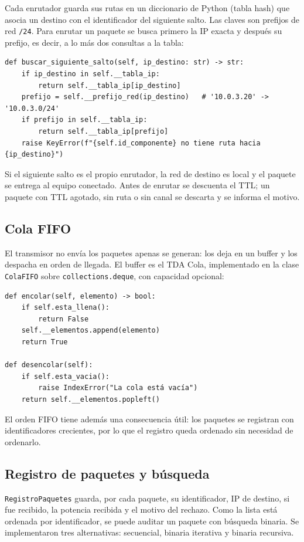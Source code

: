 \documentclass[11pt,a4paper]{article}
\begin{document}
Cada enrutador guarda sus rutas en un diccionario de Python (tabla hash) que
asocia un destino con el identificador del siguiente salto. Las claves son
prefijos de red \texttt{/24}. Para enrutar un paquete se busca primero la IP
exacta y después su prefijo, es decir, a lo más dos consultas a la tabla:

\begin{lstlisting}
def buscar_siguiente_salto(self, ip_destino: str) -> str:
    if ip_destino in self.__tabla_ip:
        return self.__tabla_ip[ip_destino]
    prefijo = self.__prefijo_red(ip_destino)   # '10.0.3.20' -> '10.0.3.0/24'
    if prefijo in self.__tabla_ip:
        return self.__tabla_ip[prefijo]
    raise KeyError(f"{self.id_componente} no tiene ruta hacia {ip_destino}")
\end{lstlisting}

Si el siguiente salto es el propio enrutador, la red de destino es local y el
paquete se entrega al equipo conectado. Antes de enrutar se descuenta el TTL;
un paquete con TTL agotado, sin ruta o sin canal se descarta y se informa el
motivo.

\subsection{Cola FIFO}

El transmisor no envía los paquetes apenas se generan: los deja en un buffer y
los despacha en orden de llegada. El buffer es el TDA Cola, implementado en la
clase \texttt{ColaFIFO} sobre \texttt{collections.deque}, con capacidad
opcional:

\begin{lstlisting}
def encolar(self, elemento) -> bool:
    if self.esta_llena():
        return False
    self.__elementos.append(elemento)
    return True

def desencolar(self):
    if self.esta_vacia():
        raise IndexError("La cola está vacía")
    return self.__elementos.popleft()
\end{lstlisting}

El orden FIFO tiene además una consecuencia útil: los paquetes se registran con
identificadores crecientes, por lo que el registro queda ordenado sin
necesidad de ordenarlo.

\subsection{Registro de paquetes y búsqueda}

\texttt{RegistroPaquetes} guarda, por cada paquete, su identificador, IP de
destino, si fue recibido, la potencia recibida y el motivo del rechazo. Como la
lista está ordenada por identificador, se puede auditar un paquete con búsqueda
binaria. Se implementaron tres alternativas: secuencial, binaria iterativa y
binaria recursiva.
\end{document}
